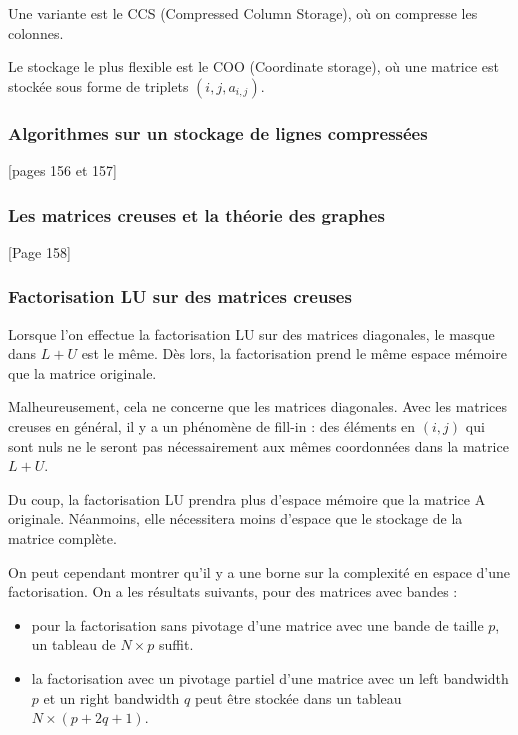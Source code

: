 		Une variante est le CCS (Compressed Column Storage), où on compresse les colonnes.
		
		Le stockage le plus flexible est le COO (Coordinate storage), où une matrice est stockée sous forme de triplets $(i, j, a_{i, j})$.
		
		\subsubsection{Algorithmes sur un stockage de lignes compressées}
		
		[pages 156 et 157]
		
		\subsubsection{Les matrices creuses et la théorie des graphes}
		
		[Page 158]
		
		\subsubsection{Factorisation LU sur des matrices creuses}
		
		Lorsque l'on effectue la factorisation LU sur des matrices diagonales, le masque dans $L + U$ est le même. Dès lors, la factorisation prend le même espace mémoire que la matrice originale.
		
		Malheureusement, cela ne concerne que les matrices diagonales. Avec les matrices creuses en général, il y a un phénomène de fill-in : des éléments en $(i, j)$ qui sont nuls ne le seront pas nécessairement aux mêmes coordonnées dans la matrice $L + U$.
		
		Du coup, la factorisation LU prendra plus d'espace mémoire que la matrice A originale. Néanmoins, elle nécessitera moins d'espace que le stockage de la matrice complète.
		
		On peut cependant montrer qu'il y a une borne sur la complexité en espace d'une factorisation. On a les résultats suivants, pour des matrices avec bandes :
		
		\begin{itemize}
			\item pour la factorisation sans pivotage d'une matrice avec une bande de taille $p$, un tableau de $N \times p$ suffit.
			\item la factorisation avec un pivotage partiel d'une matrice avec un left bandwidth $p$ et un right bandwidth $q$ peut être stockée dans un tableau $N \times (p + 2q + 1)$.
		\end{itemize}
		
